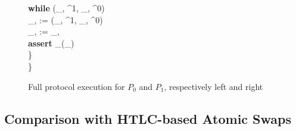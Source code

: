 \begin{figure}[H]
\begin{minipage}[t]{0.5\textwidth}
\begin{pchstack}[boxed]
{	\qquad \textbf{while} \: \not\exists \:  \in \st \mid (\pk_{, \bcb}^1, \pk_{, \bcb}^0) \in {} \\
	\qquad \tx_{, \bcb} :=  \in \st \mid (\pk_{, \bcb}^1, \pk_{, \bcb}^0) \in {} \\
	\qquad \tx_{, \bca} :=  \oplus  \tx_{, \bcb} \\
	\qquad \textbf{assert} \: _\bca(\tx_{}) \\
        \quad \} \\
        \} \\
    }
    \end{pchstack}
    \end{minipage}%
    \caption{Full protocol execution for $P_0$ and $P_1$, respectively left and right}
    \end{figure}

\subsection{Comparison with HTLC-based Atomic Swaps}

\newpage
